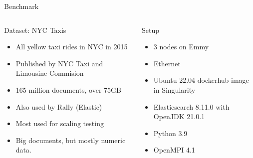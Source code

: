 \documentclass[compress,aspectratio=169]{beamer}
\begin{document}
  \begin{frame}{Benchmark}
    \begin{columns}
      \begin{column}{0.5\textwidth}
        \begin{block}{Dataset: NYC Taxis \cite{nyctaxis}}
          \begin{itemize}
            \item All yellow taxi rides in NYC in 2015
            \item Published by NYC Taxi and Limousine Commision \cite{tlcdata}
            \item 165 million documents, over 75GB
            \item Also used by Rally (Elastic)
            \item Most used for scaling testing
            \item Big documents, but mostly numeric data.
          \end{itemize}
        \end{block}
      \end{column}
      \begin{column}{0.5\textwidth}
        \begin{block}{Setup}
          \begin{itemize}
            \item 3 nodes on Emmy
            \item Ethernet
            \item Ubuntu 22.04 dockerhub image in Singularity
            \item Elasticsearch 8.11.0 with OpenJDK 21.0.1
            \item Python 3.9
            \item OpenMPI 4.1
          \end{itemize}
        \end{block}
      \end{column}
    \end{columns}
  \end{frame}
\end{document}
